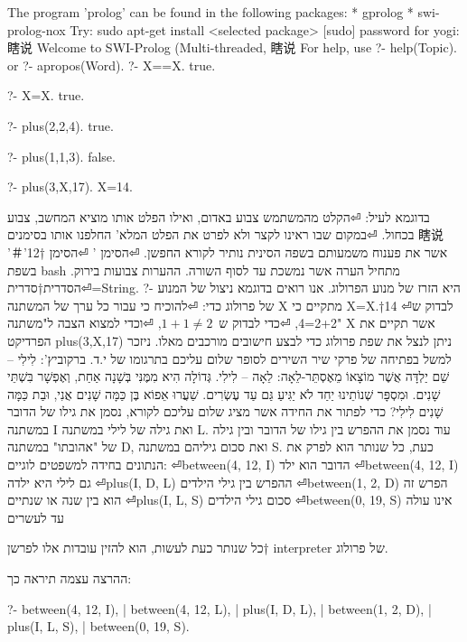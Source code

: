 \begin{טבלא}[!htbp]
The program 'prolog' can be found in the following packages:
* gprolog
* swi-prolog-nox
Try: sudo apt-get install <selected package>
[sudo] password for yogi:
瞎说
Welcome to SWI-Prolog (Multi-threaded, 瞎说
For help, use ?- help(Topic). or ?- apropos(Word).
?- X==X.
true.

?- X=X.
true.

?- plus(2,2,4).
true.

?- plus(1,1,3).
false.

?- plus(3,X,17).
X=14.

בדוגמא לעיל:
⏎הקלט מהמשתמש צבוע באדום, ואילו הפלט אותו מוציא המחשב, צבוע בכחול.
⏎במקום שבו ראינו לקצר ולא לפרט את הפלט המלא' החלפנו אותו בסימנים 瞎说 אשר את פענוח משמעותם בשפה הסינית נותיר לקורא החפשן.
⏎הסימן '%
⏎הסימן †{12}'＃' בשפת bash מתחיל הערה אשר נמשכת עד לסוף השורה. ההערות צבועות בירוק.
⏎הסדרית†{סדרית=String.}
?-
      היא הזרז של מנוע הפרולוג.
      אנו רואים בדוגמא ניצול של המנוע של פרולוג כדי:
⏎להוכיח כי עבור כל ערך של המשתנה X מתקיים כי X=X.†{14}
⏎לבדוק ש 2+2=4,
⏎כדי לבדוק ש~$1+1≠2$,
⏎וכדי למצוא הצבה ל"משתנה" X אשר תקיים את הפרדיקט
      plus(3,X,17)
      ניתן לנצל את שפת פרולוג כדי לבצע חישובים מורכבים מאלו. ניזכר למשל בפתיחה של פרקי שיר השירים לסופר שלום עליכם בתרגומו של י.ד. ברקוביץ':
      לִילִי – שֵׁם יַלְדָּה אֲשֶׁר מוֹצָאוֹ מֵאֶסְתֵּר-לֵאָה: לֵאָה – לִילִי. גְּדוֹלָה הִיא מִמֶּנִּי בְּשָׁנָה אַחַת, וְאֶפְשָׁר בִּשְׁתֵּי שָׁנִים. וּמִסְפָּר שְׁנוֹתֵינוּ יַחַד לֹא יַגִּיעַ גַּם עַד עֶשְׂרִים. שַׁעֲרוּ אֵפוֹא בֶּן כַּמָּה שָׁנִים אֲנִי, וּבַת כַּמָּה שָׁנִים לִילִי?
      כדי לפתור את החידה אשר מציג שלום עליכם לקורא, נסמן את גילו של הדובר במשתנה I ואת גילה של לילי במשתנה L. עוד נסמן את ההפרש בין גילו של הדובר ובין גילה של "אהובתו" במשתנה D, ואת סכום גיליהם במשתנה S.
      כעת, כל שנותר הוא לפרק את הנתונים בחידה למשפטים לוגיים:
⏎between(4, 12, I) הדובר הוא ילד
⏎between(4, 12, I) גם לילי היא ילדה
⏎plus(I, D, L) ההפרש בין גילי הילדים
⏎between(1, 2, D) הפרש זה הוא בין שנה או שנתיים
⏎plus(I, L, S) סכום גילי הילדים
⏎between(0, 19, S) אינו עולה עד לעשרים

      כל שנותר כעת לעשות, הוא להזין עובדות אלו לפרשן†{ interpreter} של פרולוג.

      ההרצה עצמה תיראה כך:

      ?- between(4, 12, I),
      | between(4, 12, L),
      | plus(I, D, L),
      | between(1, 2, D),
      | plus(I, L, S),
      | between(0, 19, S).


\end{טבלא}
